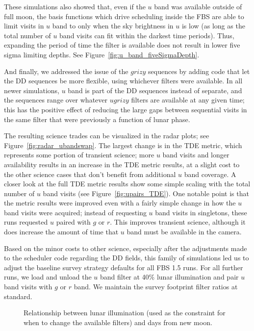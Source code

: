 These simulations also showed that, even if the $u$ band was available outside of full moon, the basis functions which drive scheduling inside the FBS are able to limit visits in $u$ band to only when the sky brightness in $u$ is low (as long as the total number of $u$ band visits can fit within the darkest time periods). Thus, expanding the period of time the filter is available does not result in lower five sigma limiting depths. See Figure~\ref{fig:u_band_fiveSigmaDepth}. 

And finally, we addressed the issue of the $grizy$ sequences by adding code that let the DD sequences be more flexible, using whichever filters were available. In all newer simulations, $u$ band is part of the DD sequences instead of separate, and the sequences range over whatever $ugrizy$ filters are available at any given time; this has the positive effect of reducing the large gaps between sequential visits in the same filter that were previously a function of lunar phase. 

The resulting science trades can be visualized in the radar plots; see Figure~\ref{fig:radar_ubandswap}. The largest change is in the TDE metric, which represents some portion of transient science; more $u$ band visits and longer availability results in an increase in the TDE metric results, at a slight cost to the other science cases that don't benefit from additional $u$ band coverage.  A closer look at the full TDE metric results show some simple scaling with the total number of $u$ band visits (see Figure~\ref{fig:upairs_TDE}). One notable point is that the metric results were improved even with a fairly simple change in how the $u$ band visits were acquired; instead of requesting $u$ band visits in singletons, these runs requested $u$ paired with $g$ or $r$. This improves transient science, although it does increase the amount of time that $u$ band must be available in the camera. 

Based on the minor costs to other science, especially after the adjustments made to the scheduler code regarding the DD fields, this family of simulations led us to adjust the baseline survey strategy defaults for all FBS 1.5 runs. For all further runs, we load and unload the $u$ band filter at 40\% lunar illumination and pair $u$ band visits with $g$ or $r$ band. We maintain the survey footprint filter ratios at standard. 

\begin{figure}
\caption{Relationship between lunar illumination (used as the constraint for when to change the available filters) and days from new moon.}
\label{fig:lunarIllum}
\end{figure}

